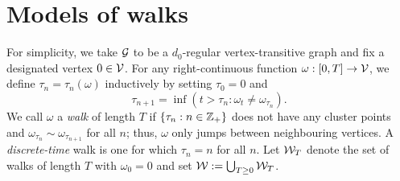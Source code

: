 \section{Models of walks}


For simplicity, we take $\mathcal{G}$ to be a $d_0$-regular vertex-transitive graph and fix a designated vertex $0 \in \mathcal{V}$.
For any right-continuous function $\omega : [0, T] \rightarrow \mathcal{V}$, we define
$\tau_n = \tau_n(\omega)$ inductively by setting $\tau_0 = 0$ and
\begin{equation}
\tau_{n+1} = \inf(t > \tau_n : \omega_t \ne \omega_{\tau_n}).
\end{equation}
We call $\omega$ a \emph{walk} of length $T$ if
$\{ \tau_n : n \in {\mathbb Z}_+ \}$ does not have any cluster points and
$\omega_{\tau_n} \sim \omega_{\tau_{n+1}}$ for all $n$; thus, $\omega$
only jumps between neighbouring vertices.
A \emph{discrete-time} walk is one for which $\tau_n = n$ for all $n$.
Let $\mathcal{W}_T$ denote the set of walks of length $T$ with $\omega_0 = 0$ and set $\mathcal{W} := \bigcup_{T \geq 0} \mathcal{W}_T$.

